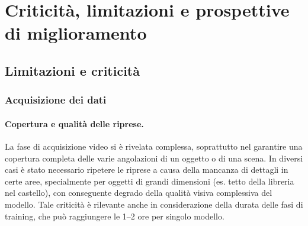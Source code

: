 \chapter{Criticità, limitazioni e prospettive di miglioramento}

\section{Limitazioni e criticità}

\subsection{Acquisizione dei dati}
\subsubsection{Copertura e qualità delle riprese.}
La fase di acquisizione video si è rivelata complessa, soprattutto nel garantire una copertura completa delle varie angolazioni di un oggetto o di una scena.  
In diversi casi è stato necessario ripetere le riprese a causa della mancanza di dettagli in certe aree, specialmente per oggetti di grandi dimensioni (es. tetto della libreria nel castello), con conseguente degrado della qualità visiva complessiva del modello.  
Tale criticità è rilevante anche in considerazione della durata delle fasi di training, che può raggiungere le 1--2 ore per singolo modello.

